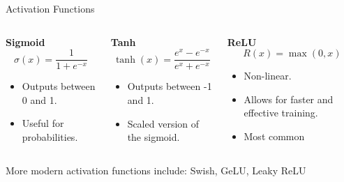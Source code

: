 \documentclass[aspectratio=169]{../latex_main/tntbeamer}  %
\begin{document}
	\begin{frame}{Activation Functions}

        \begin{columns}
            \begin{column}{0.33\textwidth}
                \textbf{Sigmoid}
                \[
                \sigma(x) = \frac{1}{1 + e^{-x}}
                \]
                \begin{itemize}
                    \item Outputs between 0 and 1.
                    \item Useful for probabilities.
                \end{itemize}
            \end{column}

         \begin{column}{0.33\textwidth}
                \textbf{Tanh}
                \[
                \tanh(x) = \frac{e^{x} - e^{-x}}{e^{x} + e^{-x}}
                \]
                \begin{itemize}
                    \item Outputs between -1 and 1.
                    \item Scaled version of the sigmoid.
                \end{itemize}
            \end{column}
            
            \begin{column}{0.33\textwidth}
                \textbf{ReLU}
                \[
                R(x) = \max(0, x)
                \]
                \begin{itemize}
                    \item Non-linear.
                    \item Allows for faster and effective training.
                    \item Most common
                \end{itemize}
            \end{column}
           
        \end{columns}

        More modern activation functions include: Swish, GeLU, Leaky ReLU
                
	\end{frame}
\end{document}
